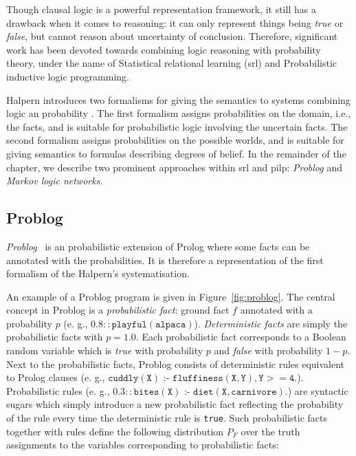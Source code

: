 Though clausal logic is a powerful representation framework, it still has a drawback when it comes to reasoning: it can only represent things being \textit{true} or \textit{false}, but cannot reason about uncertainty of conclusion.
Therefore, significant work has been devoted towards combining logic reasoning with probability theory, under the name of Statistical relational learning (\gls{srl}) and Probabilistic inductive logic programming.




Halpern introduces two formalisms for giving the semantics to systems combining logic an probability \cite{Halpern90ananalysis}.
The first formalism assigns probabilities on the domain, i.e., the facts, and is suitable for probabilistic logic involving the uncertain facts.
The second formalism assigns probabilities on the possible worlds, and is suitable for giving semantics to formulas describing degrees of belief.
In the remainder of the chapter, we describe two prominent approaches within \gls{srl} and \gls{pilp}: \textit{Problog} and \textit{Markov logic networks}.


\subsection{Problog}

\textit{Problog}~\cite{DeRaedt:2007:PPP:1625275.1625673} is an probabilistic extension of Prolog where some facts can be annotated with the probabilities.
It is therefore a representation of the first formalism of the Halpern's systematisation.

An example of a Problog program is given in Figure~\ref{fig:problog}.
The central concept in Problog is a \textit{probabilistic fact}: ground fact $f$ annotated with a probability $p$ (e. g., $0.8{:: }{\mathtt {playful(alpaca)}}$).
\textit{Deterministic facts} are simply the probabilistic facts with $p = 1.0$.
Each probabilistic fact corresponds to a Boolean random variable which is \textit{true} with probability $p$ and \textit{false} with probability $1-p$.
Next to the probabilistic facts, Problog consists of deterministic rules equivalent to Prolog clauses (e. g., ${\mathtt {cuddly(X)} \text{ :- }{\mathtt {fluffiness(X,Y),Y >= 4}}.}$).
Probabilistic rules (e. g., $0.3{:: }{\mathtt {bites(X)}} \text{ :- }{\mathtt {diet(X,carnivore)}}.$) are syntactic sugars which simply introduce a new probabilistic fact reflecting the probability of the rule every time the deterministic rule is \texttt{true}.
Such probabilistic facts together with rules define the following distribution $P_{F}$ over the truth assignments to the variables corresponding to probabilistic facts:

